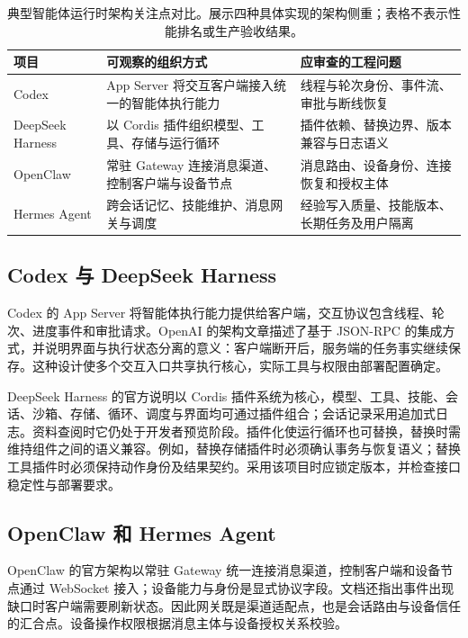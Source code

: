 \documentclass[../textbook.tex]{subfiles}
\begin{document}
\begin{table}[htbp]
\centering
\caption[典型智能体运行时架构关注点对比]{典型智能体运行时架构关注点对比。展示四种具体实现的架构侧重；表格不表示性能排名或生产验收结果。}\label{tab:agent-runtime-harness-platforms}
\begin{tabularx}{\linewidth}{@{}p{2.5cm}XX@{}}
\toprule 项目 & 可观察的组织方式 & 应审查的工程问题\\\midrule
Codex & App Server 将交互客户端接入统一的智能体执行能力 & 线程与轮次身份、事件流、审批与断线恢复\\
DeepSeek Harness & 以 Cordis 插件组织模型、工具、存储与运行循环 & 插件依赖、替换边界、版本兼容与日志语义\\
OpenClaw & 常驻 Gateway 连接消息渠道、控制客户端与设备节点 & 消息路由、设备身份、连接恢复和授权主体\\
Hermes Agent & 跨会话记忆、技能维护、消息网关与调度 & 经验写入质量、技能版本、长期任务及用户隔离\\
\bottomrule
\end{tabularx}
\end{table}

\subsection{Codex 与 DeepSeek Harness}
Codex 的 App Server 将智能体执行能力提供给客户端，交互协议包含线程、轮次、进度事件和审批请求。OpenAI 的架构文章描述了基于 JSON-RPC 的集成方式，并说明界面与执行状态分离的意义：客户端断开后，服务端的任务事实继续保存。这种设计使多个交互入口共享执行核心，实际工具与权限由部署配置确定。\cite{openai2026codexharness}

DeepSeek Harness 的官方说明以 Cordis 插件系统为核心，模型、工具、技能、会话、沙箱、存储、循环、调度与界面均可通过插件组合；会话记录采用追加式日志。资料查阅时它仍处于开发者预览阶段。\cite{deepseek2026harness}插件化使运行循环也可替换，替换时需维持组件之间的语义兼容。例如，替换存储插件时必须确认事务与恢复语义；替换工具插件时必须保持动作身份及结果契约。采用该项目时应锁定版本，并检查接口稳定性与部署要求。

\subsection{OpenClaw 和 Hermes Agent}
OpenClaw 的官方架构以常驻 Gateway 统一连接消息渠道，控制客户端和设备节点通过 WebSocket 接入；设备能力与身份是显式协议字段。文档还指出事件出现缺口时客户端需要刷新状态。\cite{openclaw2026architecture}因此网关既是渠道适配点，也是会话路由与设备信任的汇合点。设备操作权限根据消息主体与设备授权关系校验。
\end{document}
